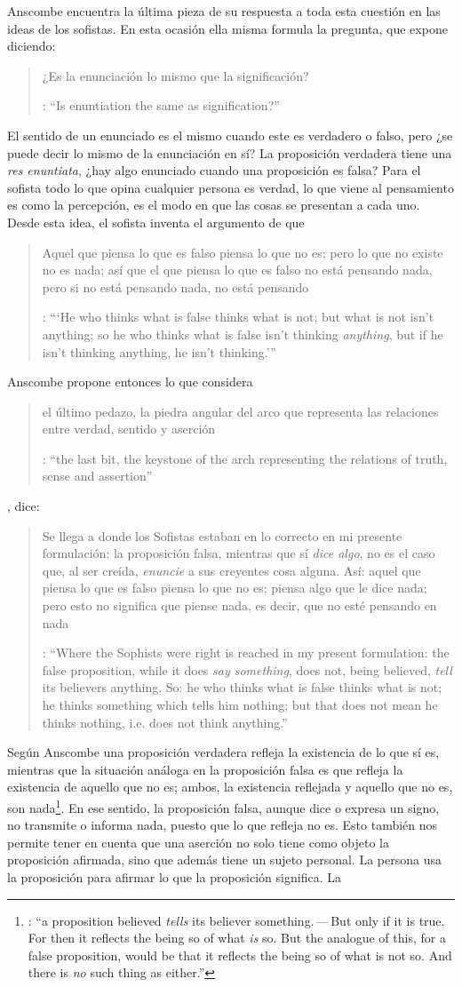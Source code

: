 Anscombe encuentra la última pieza de su respuesta a toda esta cuestión en las ideas de los sofistas. En esta ocasión ella misma formula la pregunta, que expone diciendo:  \blockquote[{\cite[271]{anscombe2015logic:tsa}}: \enquote{Is enuntiation the same as signification?}]{¿Es la enunciación lo mismo que la significación?}. El sentido de un enunciado es el mismo cuando este es verdadero o falso, pero ¿se puede decir lo mismo de la enunciación en sí? La proposición verdadera tiene una \emph{res enuntiata}, ¿hay algo enunciado cuando una proposición es falsa? Para el sofista todo lo que opina cualquier persona es verdad, lo que viene al pensamiento es como la percepción, es el modo en que las cosas se presentan a cada uno. Desde esta idea, el sofista inventa el argumento de que \blockquote[{\cite[264]{anscombe2015logic:tsa}}: \enquote{`He who thinks what is false thinks what is not; but what is not isn't anything; so he who thinks what is false isn't thinking \emph{anything}, but if he isn't thinking anything, he isn't thinking.'}]{Aquel que piensa lo que es falso piensa lo que no es; pero lo que no existe no es nada; así que el que piensa lo que es falso no está pensando nada, pero si no está pensando nada, no está pensando}. Anscombe propone entonces lo que considera \blockquote[{\cite[271]{anscombe2015logic:tsa}}: \enquote{the last bit, the keystone of the arch representing the relations of truth, sense and assertion}]{el último pedazo, la piedra angular del arco que representa las relaciones entre verdad, sentido y aserción}, dice: \blockquote[{\cite[271]{anscombe2015logic:tsa}}: \enquote{Where the Sophists were right is reached in my present formulation: the false proposition, while it does \emph{say something}, does not, being believed, \emph{tell} its believers anything. So: he who thinks what is false thinks what is not; he thinks something which tells him nothing; but that does not mean he thinks nothing, i.e. does not think anything.}]{Se llega a donde los Sofistas estaban en lo correcto en mi presente formulación: la proposición falsa, mientras que sí \emph{dice algo}, no es el caso que, al ser creída, \emph{enuncie} a sus creyentes cosa alguna. Así: aquel que piensa lo que es falso piensa lo que no es; piensa algo que le dice nada; pero esto no significa que piense nada, es decir, que no esté pensando en nada}. Según Anscombe una proposición verdadera refleja la existencia de lo que sí es, mientras que la situación análoga en la proposición falsa es que refleja la existencia de aquello que no es; ambos, la existencia reflejada y aquello que no es, son nada\footnote{\cite[271]{anscombe2015logic:tsa}: \enquote{a proposition believed \emph{tells} its believer something.\,---\,But only if it is true. For then it reflects the being so of what \emph{is} so. But the analogue of this, for a false proposition, would be that it reflects the being so of what is not so. And there is \emph{no} such thing as either.}}. En ese sentido, la proposición falsa, aunque dice o expresa un signo, no transmite o informa nada, puesto que lo que refleja no es. Esto también nos permite tener en cuenta que una aserción no solo tiene como objeto la proposición afirmada, sino que además tiene un sujeto personal. La persona usa la proposición para afirmar lo que la proposición significa. La 